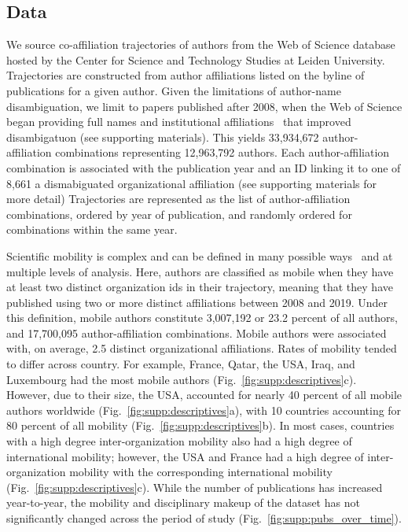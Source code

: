 \documentclass[12pt]{article} %
\begin{document}
\subsection*{Data}
We source co-affiliation trajectories of authors from the Web of Science database hosted by the Center for Science and Technology Studies at Leiden University.
Trajectories are constructed from author affiliations listed on the byline of publications for a given author.
Given the limitations of author-name disambiguation, we limit to papers published after 2008, when the Web of Science began providing full names and institutional affiliations~\autocite{caron2014disambiguation} that improved disambigatuon (see supporting materials).
This yields 33,934,672 author-affiliation combinations representing 12,963,792 authors.
Each author-affiliation combination is associated with the publication year and an ID linking it to one of 8,661 a dismabiguated organizational affiliation (see supporting materials for more detail)
Trajectories are represented as the list of author-affiliation combinations, ordered by year of publication, and randomly ordered for combinations within the same year.

Scientific mobility is complex and can be defined in many possible ways~\autocite{robinson2019mobility} and at multiple levels of analysis.
Here, authors are classified as mobile when they have at least two distinct organization ids in their trajectory, meaning that they have published using two or more distinct affiliations between 2008 and 2019.
Under this definition, mobile authors constitute 3,007,192 or 23.2 percent of all authors, and 17,700,095 author-affiliation combinations.
Mobile authors were associated with, on average, 2.5 distinct organizational affiliations.
Rates of mobility tended to differ across country.
For example, France, Qatar, the USA, Iraq, and Luxembourg had the most mobile authors (Fig.~\ref{fig:supp:descriptives}c).
However, due to their size, the USA, accounted for nearly 40 percent of all mobile authors worldwide (Fig.~\ref{fig:supp:descriptives}a), with 10 countries accounting for 80 percent of all mobility (Fig.~\ref{fig:supp:descriptives}b).
In most cases, countries with a high degree inter-organization mobility also had a high degree of international mobility;
however, the USA and France had a high degree of inter-organization mobility with the corresponding international mobility (Fig.~\ref{fig:supp:descriptives}c).
While the number of publications has increased year-to-year, the mobility and disciplinary makeup of the dataset has not significantly changed across the period of study (Fig.~\ref{fig:supp:pubs_over_time}).
\end{document}
